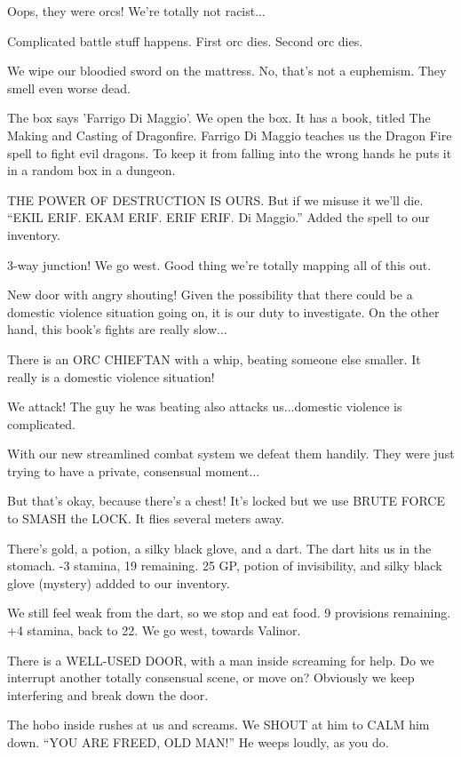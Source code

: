 \documentclass[10pt]{article}
\begin{document}
Oops, they were orcs!  We're totally not racist...

Complicated battle stuff happens.  First orc dies.  Second orc dies.

We wipe our bloodied sword on the mattress.  No, that's not a euphemism.  They smell even worse dead.

The box says 'Farrigo Di Maggio'.  We open the box.  It has a book, titled The Making and Casting of Dragonfire.  Farrigo Di Maggio teaches us the Dragon Fire spell to fight evil dragons.  To keep it from falling into the wrong hands he puts it in a random box in a dungeon.

THE POWER OF DESTRUCTION IS OURS.  But if we misuse it we'll die.  ``EKIL ERIF.  EKAM ERIF.  ERIF ERIF.  Di Maggio.''  Added the spell to our inventory.

3-way junction!  We go west.  Good thing we're totally mapping all of this out.

New door with angry shouting!  Given the possibility that there could be a domestic violence situation going on, it is our duty to investigate.  On the other hand, this book's fights are really slow...

There is an ORC CHIEFTAN with a whip, beating someone else smaller.  It really is a domestic violence situation!

We attack!  The guy he was beating also attacks us...domestic violence is complicated.

With our new streamlined combat system we defeat them handily.  They were just trying to have a private, consensual moment...

But that's okay, because there's a chest!  It's locked but we use BRUTE FORCE to SMASH the LOCK.  It flies several meters away.

There's gold, a potion, a silky black glove, and a dart.  The dart hits us in the stomach.  -3 stamina, 19 remaining.  25 GP, potion of invisibility, and silky black glove (mystery) addded to our inventory.

We still feel weak from the dart, so we stop and eat food.  9 provisions remaining.  +4 stamina, back to 22.  We go west, towards Valinor.

There is a WELL-USED DOOR, with a man inside screaming for help.  Do we interrupt another totally consensual scene, or move on?  Obviously we keep interfering and break down the door.

The hobo inside rushes at us and screams.  We SHOUT at him to CALM him down.  ``YOU ARE FREED, OLD MAN!''  He weeps loudly, as you do.
\end{document}
